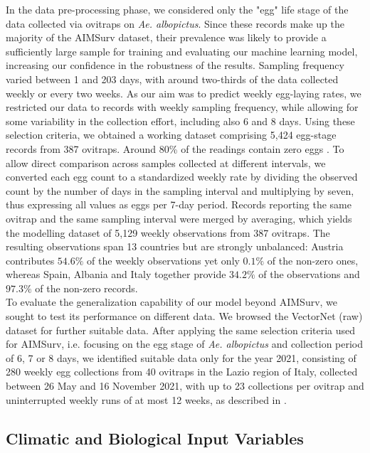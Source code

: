 \documentclass[preprint,12pt]{elsarticle}
\begin{document}
In the data pre-processing phase, we considered only the "egg" life stage of the data collected via ovitraps on \emph{Ae. albopictus}. Since these records make up the majority of the AIMSurv dataset, their prevalence was likely to provide a sufficiently large sample for training and evaluating our machine learning model, increasing our confidence in the robustness of the results. Sampling frequency varied between 1 and 203 days, with around two-thirds of the data collected weekly or every two weeks.
As our aim was to predict weekly egg-laying rates, we restricted our data to records with weekly sampling frequency, while allowing for some variability in the collection effort, including also 6 and 8 days. Using these selection criteria, we obtained a working dataset comprising 5,424 egg-stage records from 387 ovitraps. Around 80\% of the readings contain zero eggs \cite{biazzo2026_datasets}. To allow direct comparison across samples collected at different intervals, we converted each egg count to a standardized weekly rate by dividing the observed count by the number of days in the sampling interval and multiplying by seven, thus expressing all values as eggs per 7-day period. Records reporting the same ovitrap and the same sampling interval were merged by averaging, which yields the modelling dataset of 5,129 weekly observations from 387 ovitraps. The resulting observations span 13 countries but are strongly unbalanced: Austria contributes $54.6\%$ of the weekly observations yet only $0.1\%$ of the non-zero ones, whereas Spain, Albania and Italy together provide $34.2\%$ of the observations and $97.3\%$ of the non-zero records.\\

To evaluate the generalization capability of our model beyond AIMSurv, we sought to test its performance on different data. We browsed the VectorNet (raw) dataset \cite{VectorNet2025} for further suitable data. After applying the same selection criteria used for AIMSurv, i.e. focusing on the egg stage of \emph{Ae. albopictus} and collection period of 6, 7 or 8 days, we identified suitable data only for the year 2021, consisting of 280 weekly egg collections from 40 ovitraps in the Lazio region of Italy, collected between 26 May and 16 November 2021, with up to 23 collections per ovitrap and uninterrupted weekly runs of at most 12 weeks, as described in \cite{Romiti2022}.

\subsection{Climatic and Biological Input Variables}
\end{document}
